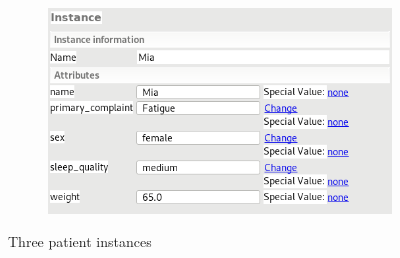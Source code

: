 \documentclass[a4paper]{article}
\begin{document}
\begin{enumerate}[label=\alph*)]
\begin{figure}[H]
                \begin{subfigure}{.47\itemizewidth}%
                    \includegraphics[width=\linewidth]{mia.png}
                \end{subfigure}
                \caption{Three patient instances}
                \label{fig:instances}
            \end{figure}
    \end{enumerate}
\end{document}
